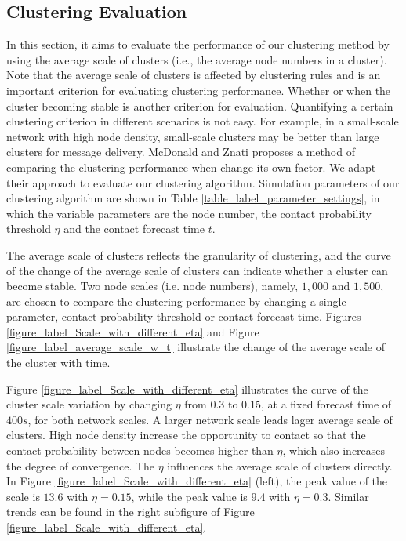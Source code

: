 \documentclass[conference]{IEEEtran}
\begin{document}
\subsection{Clustering Evaluation}

 In this section, it aims to evaluate the performance of our clustering method by using the average scale of clusters (i.e., the average node numbers in a cluster). Note that the average scale of clusters is affected by clustering rules and is an important criterion for evaluating clustering performance. Whether or when the cluster becoming stable is another criterion for evaluation. Quantifying a certain clustering criterion in different scenarios is not easy. For example, in a small-scale network with high node density, small-scale clusters may be better than large clusters for message delivery.
McDonald and Znati \cite{zcMcdonaldZnati-30} proposes a method of comparing the clustering performance when change its own factor. We adapt their approach to evaluate our clustering algorithm. Simulation parameters of our clustering algorithm are shown in Table \ref{table_label_parameter_settings}, in which the variable parameters are the node number, the contact probability threshold $\eta$ and the contact forecast time $t$.

The average scale of clusters reflects the granularity of clustering, and the curve of the change of the average scale of clusters can indicate whether a cluster can become stable. Two node scales (i.e. node numbers), namely, $1,000$ and $1,500$, are chosen to compare the clustering performance by changing a single parameter, contact probability threshold or contact forecast time. Figures \ref{figure_label_Scale_with_different_eta} and Figure \ref{figure_label_average_scale_w_t} illustrate the change of the average scale of the cluster with time.

Figure \ref{figure_label_Scale_with_different_eta} illustrates the curve of the cluster scale variation by changing $\eta$ from  $0.3$ to $0.15$, at a fixed forecast time of $400s$, for both network scales. A larger network scale leads lager average scale of clusters. High node density increase the opportunity to contact so that the contact probability between nodes becomes higher than $\eta$, which also increases the degree of convergence. The $\eta$ influences the average scale of clusters directly. In Figure \ref{figure_label_Scale_with_different_eta} (left), the peak value of the scale is $13.6$ with $\eta=0.15$, while the peak value is $9.4$ with $\eta =0.3$. Similar trends can be found in the right subfigure of Figure \ref{figure_label_Scale_with_different_eta}.
\end{document}

